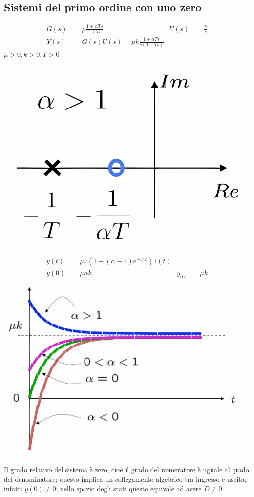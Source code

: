 \documentclass{article}
\numberwithin{equation}{subsection}
\let\oldsubsection\subsection%
\renewcommand{\subsection}{%
  \renewcommand{\theequation}{\thesubsection.\arabic{equation}}%
  \oldsubsection}%
\begin{document}
\subsection{Sistemi del primo ordine con uno zero}
\begin{align*}
    G(s) &= \mu \frac{1+ \alpha T s}{1+Ts} & U(s) &= \frac{k}{s}\\
    Y(s) &= G(s) U(s) = \mu k \frac{1+ \alpha T s}{s(1+Ts)}
\end{align*}
$\mu>0, k>0, T>0$
\begin{center}
    \includegraphics[scale=0.17]{Images/Primo_ordine_uno_zero_1.png}
\end{center}
\begin{align*}
    y(t) &= \mu k (1+(\alpha-1) e^{-t/T})1(t)\\
    y(0) &= \mu \alpha k & y_{\infty} &= \mu k
\end{align*}
\begin{center}
    \includegraphics[scale=0.16]{Images/Primo_ordine_uno_zero_2.png}
\end{center}
Il grado relativo del sistema è zero, cioè il grado del numeratore è uguale al grado del denominatore; questo implica un collegamento algebrico tra ingresso e uscita, infatti $y(0) \neq 0$; nello spazio degli stati questo equivale ad avere $D \neq 0$.
\end{document}
